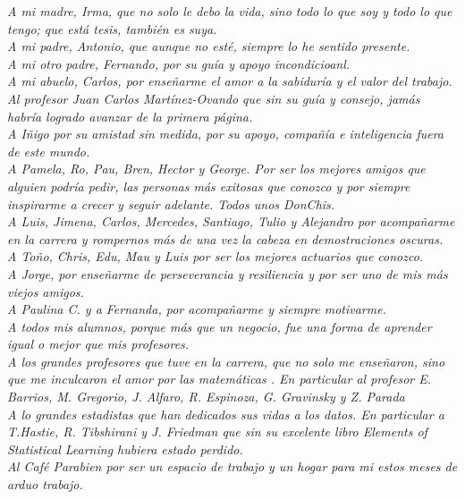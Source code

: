 \documentclass[../Main/Main.tex]{subfiles}
\begin{document}
\thispagestyle{empty}
\setcounter{page}{0} %
\begin{flushright}
	\null{}
	\emph{A mi madre, Irma, que no solo le debo la vida, sino todo lo que soy y todo lo que tengo; que está tesis, también es suya.} 
	\\
	\emph{A mi padre, Antonio, que aunque no esté, siempre lo he sentido presente.} 
	\\
	\emph{A mi otro padre, Fernando, por su guía y apoyo incondicioanl.}
	\\
	\emph{A mi abuelo, Carlos, por enseñarme el amor a la sabiduría y el valor del trabajo.}	
	\\
	\emph{Al profesor Juan Carlos Martínez-Ovando que sin su guía y consejo, jamás habría logrado avanzar de la primera página.}
	\\
	\emph{A Iñigo por su amistad sin medida, por su apoyo, compañía e inteligencia fuera de este mundo. }
	\\
	\emph{A Pamela, Ro, Pau, Bren, Hector y George. Por ser los mejores amigos que alguien podría pedir, las personas más exitosas que conozco y por siempre inspirarme a crecer y seguir adelante. Todos unos DonChis.}
	\\
	\emph{A Luis, Jimena, Carlos, Mercedes, Santiago, Tulio y Alejandro por acompañarme en la carrera y rompernos más de una vez la cabeza en demostraciones oscuras.}
	\\
	\emph{A Toño, Chris, Edu, Mau y Luis por ser los mejores actuarios que conozco.}
	\\
	\emph{A Jorge, por enseñarme de perseverancia y resiliencia y por ser uno de mis más viejos amigos. }
	\\
	\emph{A Paulina C. y a Fernanda, por acompañarme y siempre motivarme. }
	\\
	\emph{A todos mis alumnos, porque más que un negocio, fue una forma de aprender igual o mejor que mis profesores.}
	\\
	\emph{A los grandes profesores que tuve en la carrera, que no solo me enseñaron, sino que me inculcaron el amor por las matemáticas . En particular al profesor E. Barrios, M. Gregorio, J. Alfaro, R. Espinoza, G. Gravinsky y Z. Parada}
	\\
	\emph{A lo grandes estadistas que han dedicados sus vidas a los datos. En particular a T.Hastie, R. Tibshirani y J. Friedman que sin su excelente libro \textit{Elements of Statistical Learning} hubiera estado perdido.} 
	\\
	\emph{Al Café Parabien por ser un espacio de trabajo y un hogar para mi estos meses de arduo trabajo.}
	\null
\end{flushright}
\end{document}
